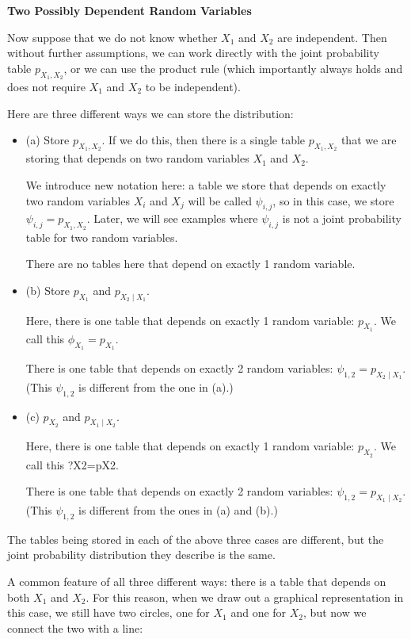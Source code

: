 \documentclass[6008notes.tex]{subfiles}
\begin{document}
\textbf{Two Possibly Dependent Random Variables}

Now suppose that we do not know whether $X_1$ and $X_2$ are independent. Then without further assumptions, we can work directly with the joint probability table $p_{X_1, X_2}$, or we can use the product rule (which importantly always holds and does not require $X_1$ and $X_2$ to be independent).

Here are three different ways we can store the distribution:

\begin{itemize}
\item (a) Store $p_{X_1, X_2}$. If we do this, then there is a single table $p_{X_1, X_2}$ that we are storing that depends on two random variables $X_1$ and $X_2$.

We introduce new notation here: a table we store that depends on exactly two random variables $X_i$ and $X_j$ will be called $\psi_{i, j}$, so in this case, we store $\psi_{i, j} = p_{X_1, X_2}$. Later, we will see examples where $\psi_{i, j}$ is not a joint probability table for two random variables.

There are no tables here that depend on exactly 1 random variable.

\item (b) Store $p_{X_1}$ and $p_{X_2 \mid X_1}$.

Here, there is one table that depends on exactly 1 random variable: $p_{X_1}$. We call this $\phi _{X_1} = p_{X_1}$.

There is one table that depends on exactly 2 random variables: $\psi _{1, 2} = p_{X_2 \mid X_1}$. (This $\psi _{1, 2}$ is different from the one in (a).)

\item (c) $p_{X_2}$ and $p_{X_1 \mid X_2}$.

Here, there is one table that depends on exactly 1 random variable: $p_{X_2}$. We call this ?X2=pX2.

There is one table that depends on exactly 2 random variables: $\psi _{1, 2} = p_{X_1 \mid X_2}$. (This $\psi _{1, 2}$ is different from the ones in (a) and (b).)
\end{itemize}

The tables being stored in each of the above three cases are different, but the joint probability distribution they describe is the same.

A common feature of all three different ways: there is a table that depends on both $X_1$ and $X_2$. For this reason, when we draw out a graphical representation in this case, we still have two circles, one for $X_1$ and one for $X_2$, but now we connect the two with a line:
\end{document}
